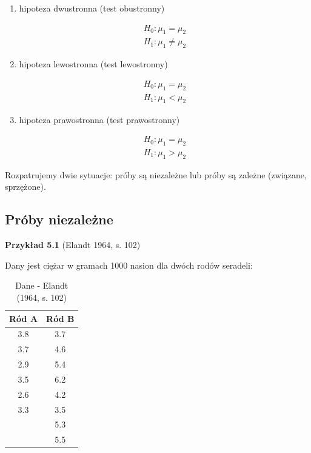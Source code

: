 \documentclass[12pt,B5paper,]{book}
\providecommand{\tightlist}{%
  \setlength{\itemsep}{0pt}\setlength{\parskip}{0pt}}
\begin{document}
\begin{enumerate}
\def\labelenumi{\alph{enumi})}
\tightlist
\item
  hipoteza dwustronna (test obustronny) \vspace{-0.6cm}

  \begin{align}
      H_0: \mu_1 = \mu_2  \\
      H_1: \mu_1 \neq \mu_2 \nonumber
  \end{align}
\item
  hipoteza lewostronna (test lewostronny) \vspace{-0.6cm}

  \begin{align}
      H_0: \mu_1 = \mu_2 \\
      H_1: \mu_1 < \mu_2 \nonumber
  \end{align}
\item
  hipoteza prawostronna (test prawostronny) \vspace{-0.6cm}

  \begin{align}
      H_0: \mu_1 = \mu_2 \\
      H_1: \mu_1 > \mu_2 \nonumber
  \end{align}
\end{enumerate}

Rozpatrujemy dwie sytuacje: próby są niezależne lub próby są zależne
(związane, sprzężone).

\subsection{Próby niezależne}\label{proby-niezalezne}

\vspace{0.8cm} \textbf{Przykład 5.1} (Elandt 1964, s. 102)

Dany jest ciężar w gramach 1000 nasion dla dwóch rodów seradeli:

\begin{table}[H]
\centering
\caption{Dane - Elandt (1964, s. 102)}
\label{saradele}
\begin{tabular}{cc}
\hline
Ród A &  Ród B \\ \hline
3.8   &  3.7          \\
3.7   &  4.6          \\
2.9   &  5.4          \\
3.5   &  6.2          \\
2.6   &  4.2          \\
3.3   &  3.5          \\
      & 5.3          \\
      & 5.5     \\ \hline     
\end{tabular}
\end{table}
\end{document}
